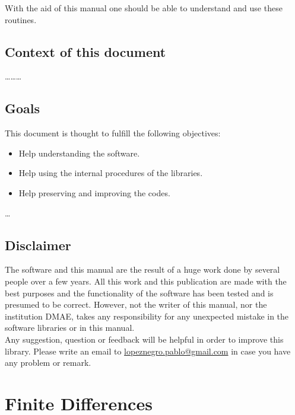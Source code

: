 \documentclass[11pt,twoside,a4paper]{book}
\begin{document}
With the aid of this manual one should be able to understand and use these
routines. \\



\section*{Context of this document}
%

\ldots\ldots\ldots


\section*{Goals}

This document is thought to fulfill the following objectives: 

\begin{itemize}
  \item{ Help understanding the software. }
  \item{ Help using the internal procedures of the libraries. }
  \item{ Help preserving and improving the codes. }
\end{itemize}

\ldots

\vfill

\section*{Disclaimer}

The software and this manual are the result of a huge work done by several
people over a few years. All this work and this publication are made with the
best purposes and the functionality of the software has been tested and is
presumed to be correct. However, not the writer of this manual, nor the institution
DMAE, takes any responsibility for any unexpected mistake in the software
libraries or in this manual. \\

Any suggestion,
question or feedback will be helpful in order to improve this library.
Please write an email to \underline{lopeznegro.pablo@gmail.com} in case you
have any problem or remark.


\newpage
\chapter{Finite Differences}

\end{document}
